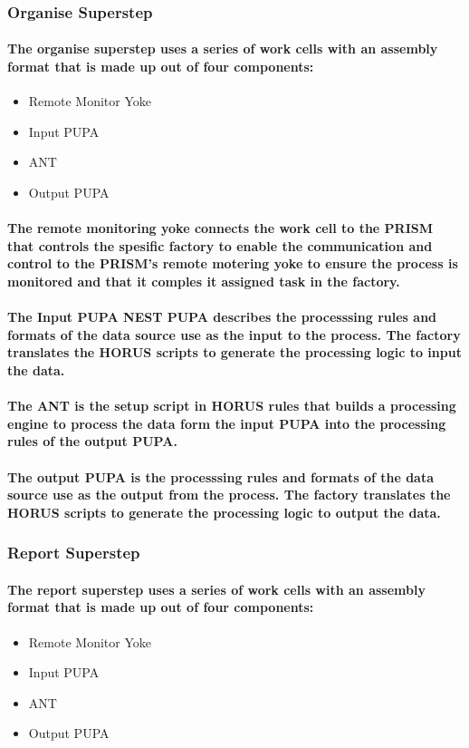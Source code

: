 \documentclass{acm_proc_article-sp}
\begin{document}
\subsubsection{Organise Superstep}
\paragraph{The organise superstep uses a series of work cells with an assembly format that is made up out of four components:}
\begin{itemize}
\item{Remote Monitor Yoke}
\item{Input PUPA}
\item{ANT}
\item{Output PUPA}
\end{itemize}
\paragraph{The remote monitoring yoke connects the work cell to the PRISM that controls the spesific factory to enable the communication and control to the PRISM's remote motering yoke to ensure the process is monitored and that it comples it assigned task in the factory.}
\paragraph{The Input PUPA NEST PUPA describes the processsing rules and formats of the data source use as the input to the process. The factory translates the HORUS scripts to generate the processing logic to input the data.}
\paragraph{The ANT is the setup script in HORUS rules that builds a processing engine to process the data form the input PUPA into the processing rules of the output PUPA. }
\paragraph{The output PUPA is the processsing rules and formats of the data source use as the output from the process. The factory translates the HORUS scripts to generate the processing logic to output the data.}
\subsubsection{Report Superstep}
\paragraph{The report superstep uses a series of work cells with an assembly format that is made up out of four components:}
\begin{itemize}
\item{Remote Monitor Yoke}
\item{Input PUPA}
\item{ANT}
\item{Output PUPA}
\end{itemize}
\end{document}
